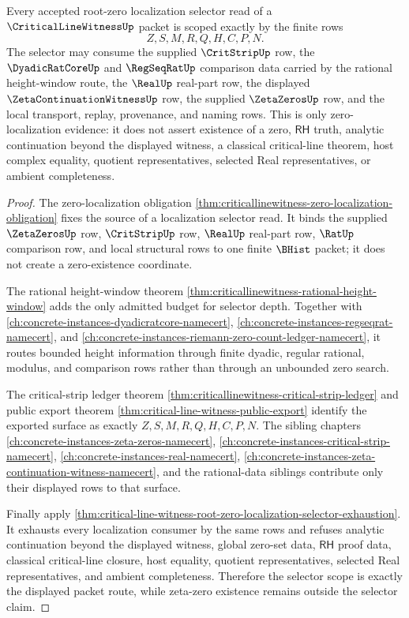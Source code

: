\begin{theorem}
\label{thm:critical-line-witness-root-zero-localization-scope}
Every accepted root-zero localization selector read of a $\CriticalLineWitnessUp$ packet is scoped exactly by the finite rows
$$
Z,S,M,R,Q,H,C,P,N .
$$
The selector may consume the supplied $\CritStripUp$ row, the $\DyadicRatCoreUp$ and $\RegSeqRatUp$ comparison data carried by the rational height-window route, the $\RealUp$ real-part row, the displayed $\ZetaContinuationWitnessUp$ row, the supplied $\ZetaZerosUp$ row, and the local transport, replay, provenance, and naming rows. This is only zero-localization evidence: it does not assert existence of a zero, $\mathsf{RH}$ truth, analytic continuation beyond the displayed witness, a classical critical-line theorem, host complex equality, quotient representatives, selected Real representatives, or ambient completeness.
\end{theorem}
\begin{proof}
The zero-localization obligation \autoref{thm:criticallinewitness-zero-localization-obligation} fixes the source of a localization selector read. It binds the supplied $\ZetaZerosUp$ row, $\CritStripUp$ row, $\RealUp$ real-part row, $\RatUp$ comparison row, and local structural rows to one finite $\BHist$ packet; it does not create a zero-existence coordinate.

The rational height-window theorem \autoref{thm:criticallinewitness-rational-height-window} adds the only admitted budget for selector depth. Together with \autoref{ch:concrete-instances-dyadicratcore-namecert}, \autoref{ch:concrete-instances-regseqrat-namecert}, and \autoref{ch:concrete-instances-riemann-zero-count-ledger-namecert}, it routes bounded height information through finite dyadic, regular rational, modulus, and comparison rows rather than through an unbounded zero search.

The critical-strip ledger theorem \autoref{thm:criticallinewitness-critical-strip-ledger} and public export theorem \autoref{thm:critical-line-witness-public-export} identify the exported surface as exactly $Z,S,M,R,Q,H,C,P,N$. The sibling chapters \autoref{ch:concrete-instances-zeta-zeros-namecert}, \autoref{ch:concrete-instances-critical-strip-namecert}, \autoref{ch:concrete-instances-real-namecert}, \autoref{ch:concrete-instances-zeta-continuation-witness-namecert}, and the rational-data siblings contribute only their displayed rows to that surface.

Finally apply \autoref{thm:critical-line-witness-root-zero-localization-selector-exhaustion}. It exhausts every localization consumer by the same rows and refuses analytic continuation beyond the displayed witness, global zero-set data, $\mathsf{RH}$ proof data, classical critical-line closure, host equality, quotient representatives, selected Real representatives, and ambient completeness. Therefore the selector scope is exactly the displayed packet route, while zeta-zero existence remains outside the selector claim.
\end{proof}
